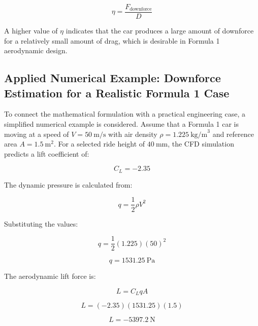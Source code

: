 \documentclass[12pt,a4paper]{article}
\begin{document}
\begin{equation}
    \eta = \frac{F_{\text{downforce}}}{D}
    \label{eq:aero_efficiency}
\end{equation}

A higher value of $\eta$ indicates that the car produces a large amount of downforce for
a relatively small amount of drag, which is desirable in Formula 1 aerodynamic design.

\subsection{Applied Numerical Example: Downforce Estimation for a Realistic Formula 1 Case}

To connect the mathematical formulation with a practical engineering case, a simplified
numerical example is considered. Assume that a Formula 1 car is moving at a speed of
$V = 50~\text{m/s}$ with air density $\rho = 1.225~\text{kg/m}^3$ and reference area
$A = 1.5~\text{m}^2$. For a selected ride height of $40~\text{mm}$, the CFD simulation
predicts a lift coefficient of:

\begin{equation}
    C_L = -2.35
\end{equation}

The dynamic pressure is calculated from:

\begin{equation}
    q = \frac{1}{2}\rho V^2
\end{equation}

Substituting the values:

\begin{equation}
    q = \frac{1}{2}(1.225)(50)^2
\end{equation}

\begin{equation}
    q = 1531.25~\text{Pa}
\end{equation}

The aerodynamic lift force is:

\begin{equation}
    L = C_L q A
\end{equation}

\begin{equation}
    L = (-2.35)(1531.25)(1.5)
\end{equation}

\begin{equation}
    L = -5397.2~\text{N}
\end{equation}
\end{document}
